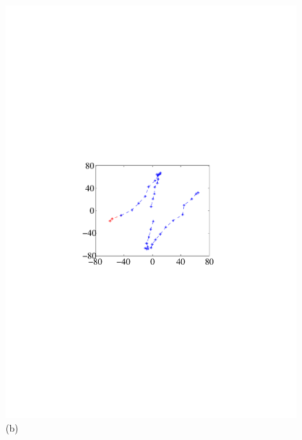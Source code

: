 \begin{figure}[!ht]
{\begin{minipage}[b]{0.23\textwidth}
                \includegraphics[width=\textwidth]{fig/distance-3m.pdf}\\
                \centering  (b)
                \end{minipage}
            }
            \hfill
\end{figure}
